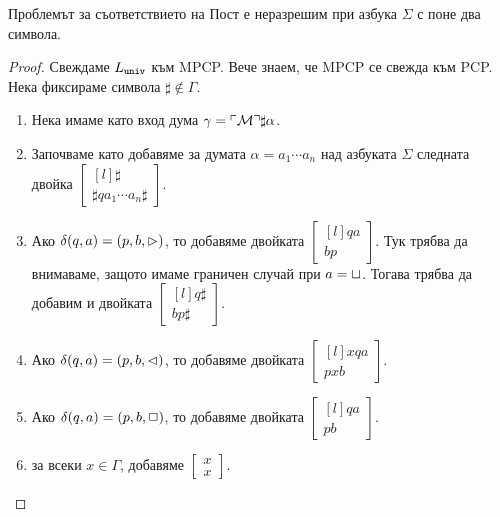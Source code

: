 \begin{framed}
  \begin{theorem}
    Проблемът за съответствието на Пост е неразрешим при азбука $\Sigma$ с поне два символа.
  \end{theorem}
\end{framed}
\begin{proof}
  Свеждаме $L_{\texttt{univ}}$ към MPCP. Вече знаем, че MPCP се свежда към PCP.
  Нека фиксираме символа $\sharp \not \in \Gamma$.
  \begin{enumerate}[1)]
  \item
    Нека имаме като вход дума $\gamma = \ulcorner{\mathcal{M}}\urcorner\sharp \alpha$.
  \item
    Започваме като добавяме за думата $\alpha = a_1\cdots a_n$ над азбуката $\Sigma$ следната двойка
    $\begin{bmatrix*}[l] \sharp\\ \sharp qa_1\cdots a_n\sharp\end{bmatrix*}$.
  \item
    Ако $\delta(q,a) = (p,b,\rhd)$, то добавяме двойката
    $\begin{bmatrix*}[l] qa\\ bp\end{bmatrix*}$.
    Тук трябва да внимаваме, защото имаме граничен случай при $a = \sqcup$. Тогава трябва да добавим и двойката $\begin{bmatrix*}[l] q\sharp\\ bp\sharp\end{bmatrix*}$.
  \item
    Ако $\delta(q,a) = (p,b,\lhd)$, то добавяме двойката
    $\begin{bmatrix*}[l] xqa\\ pxb\end{bmatrix*}$.
  \item
    Ако $\delta(q,a) = (p,b,\Box)$, то добавяме двойката
    $\begin{bmatrix*}[l] qa\\ pb\end{bmatrix*}$.
  \item
    за всеки $x \in \Gamma$, добавяме $\begin{bmatrix} x\\ x\end{bmatrix}$.

\end{enumerate}
\end{proof}
